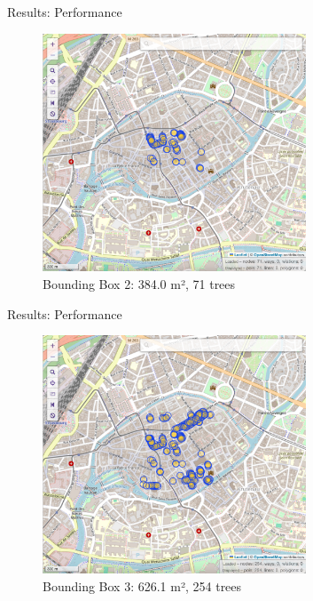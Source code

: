 \documentclass[10pt]{beamer}
\begin{document}
\begin{frame}{Results: Performance}
\Large
\begin{figure}[H]
	\centering
	\includegraphics[width=0.7\textwidth]{images/ovt-bbox2.png}
	\caption{Bounding Box 2: 384.0 m², 71 trees}
\end{figure}
\end{frame}

\begin{frame}{Results: Performance}
\Large
\begin{figure}[H]
	\centering
	\includegraphics[width=0.7\textwidth]{images/ovt-bbox3.png}
	\caption{Bounding Box 3: 626.1 m², 254 trees}
\end{figure}
\end{frame}
\end{document}
